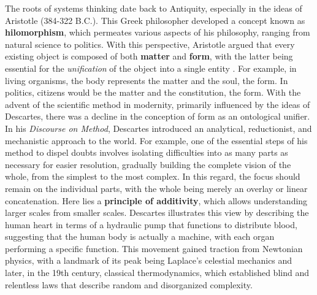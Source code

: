 \documentclass[./main_en.tex]{subfiles}
\begin{document}
\par The roots of systems thinking date back to Antiquity, especially in the ideas of Aristotle (384-322 B.C.). This Greek philosopher developed a concept known as \textbf{\gls{hilomorphism}}, which permeates various aspects of his philosophy, ranging from natural science to politics. With this perspective, Aristotle argued that every existing object is composed of both \textbf{matter} and \textbf{form}, with the latter being essential for the \textit{unification} of the object into a single entity \cite{Witt1987}. For example, in living organisms, the body represents the matter and the soul, the form. In politics, citizens would be the matter and the constitution, the form. With the advent of the scientific method in modernity, primarily influenced by the ideas of Descartes, there was a decline in the conception of form as an ontological unifier. In his \textit{Discourse on Method}, Descartes introduced an analytical, reductionist, and mechanistic approach to the world. For example, one of the essential steps of his method to dispel doubts involves isolating difficulties into as many parts as necessary for easier resolution, gradually building the complete vision of the whole, from the simplest to the most complex. In this regard, the focus should remain on the individual parts, with the whole being merely an overlay or linear concatenation. Here lies a \textbf{principle of additivity}, which allows understanding larger scales from smaller scales. Descartes illustrates this view by describing the human heart in terms of a hydraulic pump that functions to distribute blood, suggesting that the human body is actually a machine, with each organ performing a specific function. This movement gained traction from Newtonian physics, with a landmark of its peak being Laplace's celestial mechanics and later, in the 19th century, classical thermodynamics, which established blind and relentless laws that describe random and disorganized complexity.
\end{document}
